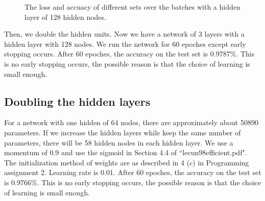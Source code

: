 \documentclass{article} %
\begin{document}
\begin{figure} [!htbp]
	
	\caption{The loss and accuacy of different sets over the batches with a hidden layer of 128 hidden nodes. }  
	
\end{figure}
Then, we double the hidden units. Now we have a network of 3 layers with a hidden layer with 128 nodes. We run the network for 60 epoches except early stopping occurs. After 60 epoches, the accuracy on the test set is 0.9787\%. This is no early stopping occurs, the possible reason is that the choice of learning is small enough.



\subsection{Doubling the hidden layers}
For a network with one hidden of 64 nodes, there are approximately about 50890 parameters. If we increase the hidden layers while keep the same number of parameters, there will be 58 hidden nodes in each hidden layer. We use a momentum of 0.9 and use the sigmoid in Section 4.4 of ``lecun98efficient.pdf". The initialization method of weights are as described in 4 (c) in Programming assignment 2. Learning rate is 0.01. After 60 epoches, the accuracy on the test set is 0.9766\%. This is no early stopping occurs, the possible reason is that the choice of learning is small enough.
\end{document}
